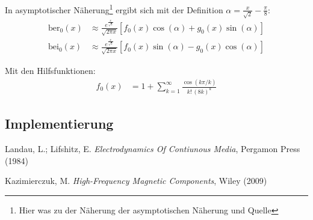 \documentclass[10pt,a4paper]{article}
\begin{document}
In asymptotischer Näherung\footnote{Hier was zu der Näherung der asymptotischen Näherung und Quelle} ergibt sich mit der Definition $\alpha = \frac{x}{\sqrt{2}}-\frac{\pi}{8}$:
\begin{align}
	\mathrm{ber}_0(x) &\approx \frac{e^{\frac{x}{\sqrt{2}}}}{\sqrt{2 \pi x}} \left[f_0(x) \cos(\alpha) + g_0(x) \sin(\alpha) \right]\\
	\mathrm{bei}_0(x) &\approx \frac{e^{\frac{x}{\sqrt{2}}}}{\sqrt{2 \pi x}} \left[f_0(x) \sin(\alpha) - g_0(x) \cos(\alpha) \right]
\end{align}

Mit den Hilfsfunktionen:
\begin{align}
  f_0(x) &= 1 + \sum^{\infty}_{k=1} \frac{\cos(k \pi / k)}{k! \, (8k)^k}
\end{align}



\subsection{Implementierung}


\begin{thebibliography}{9}

Landau, L.; Lifshitz, E.
\emph{Electrodynamics Of Contiunous Media},
Pergamon Press (1984)

Kazimierczuk, M.
\emph{High-Frequency Magnetic Components},
Wiley (2009)

\end{thebibliography}
\end{document}
